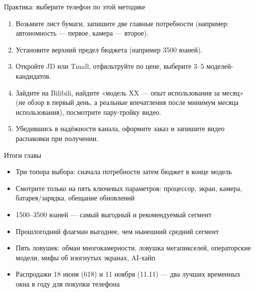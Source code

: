 \begin{tcbpractice}{Практика: выберите телефон по этой методике}
\begin{enumerate}
  \item Возьмите лист бумаги, запишите две главные потребности (например: автономность — первое, камера — второе).
  \item Установите верхний предел бюджета (например 3500 юаней).
  \item Откройте JD или Tmall, отфильтруйте по цене, выберите 3–5 моделей-кандидатов.
  \item Зайдите на Bilibili, найдите «модель XX — опыт использования за месяц» (не обзор в первый день, а реальные впечатления после минимум месяца использования), посмотрите пару-тройку видео.
  \item Убедившись в надёжности канала, оформите заказ и запишите видео распаковки при получении.
\end{enumerate}

\end{tcbpractice}

\begin{tcbsummary}{Итоги главы}
\begin{itemize}
  \item Три топора выбора: сначала потребности затем бюджет в конце модель
  \item Смотрите только на пять ключевых параметров: процессор, экран, камера, батарея/зарядка, обещание обновлений
  \item 1500–3500 юаней — самый выгодный и рекомендуемый сегмент
  \item Прошлогодний флагман выгоднее, чем нынешний средний сегмент
  \item Пять ловушек: обман многокамерности, ловушка мегапикселей, операторские модели, мифы об изогнутых экранах, AI-хайп
  \item Распродажи 18 июня (618) и 11 ноября (11.11) — два лучших временных окна в году для покупки телефона
\end{itemize}

\end{tcbsummary}
